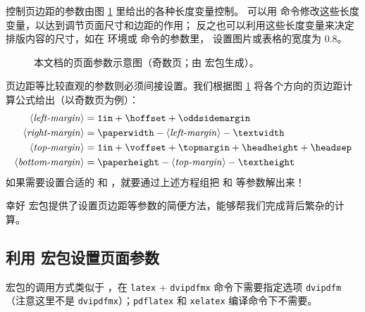 控制页边距的参数由图 \ref{fig:layouts} 里给出的各种长度变量控制。
可以用  命令修改这些长度变量，以达到调节页面尺寸和边距的作用；
反之也可以利用这些长度变量来决定排版内容的尺寸，如在  环境或  命令的参数里，
设置图片或表格的宽度为 0.8。

\begin{figure}[!p]
\centering
\layoutpicture*
\caption{本文档的页面参数示意图（奇数页；由  宏包生成）。} \label{fig:layouts}
\end{figure}

页边距等比较直观的参数则必须间接设置。我们根据图 \ref{fig:layouts} 将各个方向的页边距计算公式给出（以奇数页为例）：
\begin{align*}
\text{\Arg{left-margin}}   &= \text{\ttfamily 1in}
                            + \text{\cmd{hoffset}}
                            + \text{\cmd{oddsidemargin}} \\
\text{\Arg{right-margin}}  &= \text{\cmd{paperwidth}}
                            - \text{\Arg{left-margin}}
                            - \text{\cmd{textwidth}} \\
\text{\Arg{top-margin}}    &= \text{\ttfamily 1in}
                            + \text{\cmd{voffset}}
                            + \text{\cmd{topmargin}}
                            + \text{\cmd{headheight}}
                            + \text{\cmd{headsep}} \\
\text{\Arg{bottom-margin}} &= \text{\cmd{paperheight}}
                            - \text{\Arg{top-margin}}
                            - \text{\cmd{textheight}}
\end{align*}
如果需要设置合适的  和 ，就要通过上述方程组把  和  等参数解出来！

幸好  宏包提供了设置页边距等参数的简便方法，能够帮我们完成背后繁杂的计算。

\subsection{利用  宏包设置页面参数}\label{subsec:geometry}

 宏包的调用方式类似于 ，在 \texttt{latex} + \texttt{dvipdfmx} 命令下需要指定选项 \texttt{dvipdfm}
（注意这里不是 \texttt{dvipdfmx}）；\texttt{pdflatex} 和 \texttt{xelatex} 编译命令下不需要。

